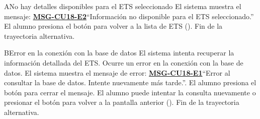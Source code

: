 \begin{UCtrayectoriaA}{A}{No hay detalles disponibles para el ETS seleccionado}
	\UCpaso El sistema muestra el mensaje: \textbf{\hyperref[msg:CU18-E2]{MSG-CU18-E2}}{``Información no disponible para el ETS seleccionado.''}
	\UCpaso[\UCactor] El alumno presiona el botón  para volver a la lista de ETS ().
	\UCpaso Fin de la trayectoria alternativa.
\end{UCtrayectoriaA}

\begin{UCtrayectoriaA}{B}{Error en la conexión con la base de datos}
	\UCpaso El sistema intenta recuperar la información detallada del ETS.
	\UCpaso Ocurre un error en la conexión con la base de datos.
	\UCpaso El sistema muestra el mensaje de error: \textbf{\hyperref[msg:CU18-E1]{MSG-CU18-E1}}{``Error al consultar la base de datos. Intente nuevamente más tarde.''}.
	\UCpaso[\UCactor] El alumno presiona el botón  para cerrar el mensaje.
	\UCpaso[\UCactor] El alumno puede intentar la consulta nuevamente o presionar el botón  para volver a la pantalla anterior ().
	\UCpaso Fin de la trayectoria alternativa.
\end{UCtrayectoriaA}



